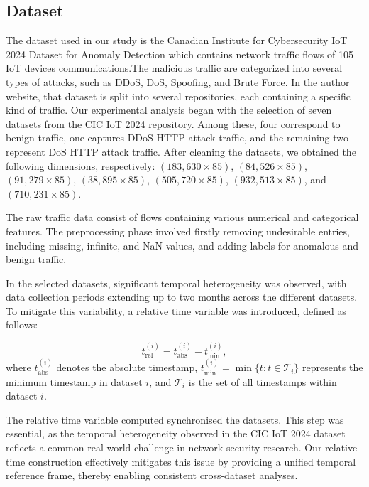 \documentclass[pdflatex,sn-mathphys-num]{sn-jnl}
\theoremstyle{thmstyleone}
\theoremstyle{thmstyletwo}
\theoremstyle{thmstylethree}
\begin{document}
\subsection{Dataset}
The dataset used in our study is the Canadian Institute for Cybersecurity IoT 2024 Dataset for Anomaly Detection \cite{rabbani2024iot-diad} which contains network traffic flows of 105 IoT devices communications.The malicious traffic are categorized into several types of attacks, such as DDoS, DoS, Spoofing, and Brute Force. In the author website, that dataset is split into several repositories, each containing a specific kind of traffic. Our experimental analysis began with the selection of seven datasets from the CIC IoT 2024 repository. Among these, four correspond to benign traffic, one captures DDoS HTTP attack traffic, and the remaining two represent DoS HTTP attack traffic. After cleaning the datasets, we obtained the following dimensions, respectively:
$(183,630 \times 85)$, $(84,526 \times 85)$, $(91,279 \times 85)$, $(38,895 \times 85)$, $(505,720 \times 85)$, $(932,513 \times 85)$, and $(710,231 \times 85)$.

The raw traffic data consist of flows containing various numerical and categorical features. The preprocessing phase involved firstly removing undesirable entries, including missing, infinite, and NaN values, and adding labels for anomalous and benign traffic.

In the selected datasets, significant temporal heterogeneity was observed, with data collection periods extending up to two months across the different datasets. To mitigate this variability, a relative time variable was introduced, defined as follows:

\begin{equation}
t_{\text{rel}}^{(i)} = t_{\text{abs}}^{(i)} - t_{\min}^{(i)},
\end{equation}
\noindent where $t_{\text{abs}}^{(i)}$ denotes the absolute timestamp, $t_{\min}^{(i)} = \min\{t : t \in \mathcal{T}_i\}$ represents the minimum timestamp in dataset $i$, and $\mathcal{T}_i$ is the set of all timestamps within dataset $i$. 

The relative time variable computed synchronised the datasets. This step was essential, as the temporal heterogeneity observed in the CIC IoT 2024 dataset reflects a common real-world challenge in network security research. Our relative time construction effectively mitigates this issue by providing a unified temporal reference frame, thereby enabling consistent cross-dataset analyses.
\end{document}

